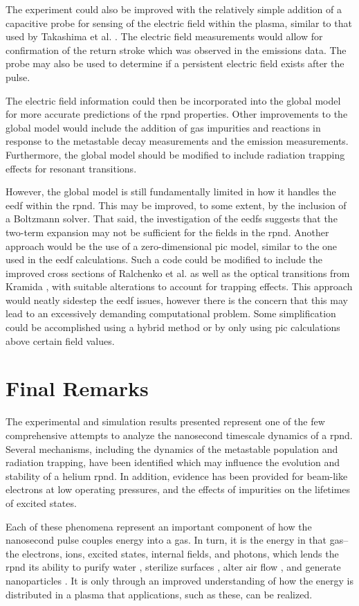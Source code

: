 The experiment could also be improved with the relatively simple addition of a
capacitive probe for sensing of the electric field within the plasma, similar to
that used by Takashima et al. \cite{Takashima2011}. The electric field
measurements would allow for confirmation of the return stroke which was
observed in the emissions data. The probe may also be used to determine if a
persistent electric field exists after the pulse.

The electric field information could then be incorporated into the global model
for more accurate predictions of the \acs{rpnd} properties. Other improvements
to the global model would include the addition of gas impurities and reactions
in response to the metastable decay measurements and the emission measurements.
Furthermore, the global model should be modified to include radiation trapping
effects for resonant transitions.

However, the global model is still fundamentally limited in how it handles the
\acs{eedf} within the \acs{rpnd}. This may be improved, to some extent, by the
inclusion of a Boltzmann solver. That said, the investigation of the \acs{eedf}s
suggests that the two-term expansion may not be sufficient for the fields in the
\acs{rpnd}. Another approach would be the use of a zero-dimensional \acs{pic}
model, similar to the one used in the \acs{eedf} calculations. Such a code could
be modified to include the improved cross sections of Ralchenko et al.
\cite{Ralchenko2008} as well as the optical transitions from Kramida
\cite{Kramida2013}, with suitable alterations to account for trapping effects.
This approach would neatly sidestep the \acs{eedf} issues, however there is the
concern that this may lead to an excessively demanding computational problem.
Some simplification could be accomplished using a hybrid method or by only using
\acs{pic} calculations above certain field values.

\section{Final Remarks}

The experimental and simulation results presented represent one of the few
comprehensive attempts to analyze the nanosecond timescale dynamics of a
\acs{rpnd}. Several mechanisms, including the dynamics of the metastable
population and radiation trapping, have been identified which may influence the
evolution and stability of a helium \acs{rpnd}. In addition, evidence has been
provided for beam-like electrons at low operating pressures, and the effects of
impurities on the lifetimes of excited states.

Each of these phenomena represent an important component of how the nanosecond
pulse couples energy into a gas. In turn, it is the energy in that gas--the
electrons, ions, excited states, internal fields, and photons, which lends the
\acs{rpnd} its ability to purify water \cite{Malik2001}, sterilize surfaces
\cite{Ayan2009}, alter air flow \cite{Nishihara2007}, and generate nanoparticles
\cite{Ostrikov2011}. It is only through an improved understanding of how the
energy is distributed in a plasma that applications, such as these, can be
realized.
